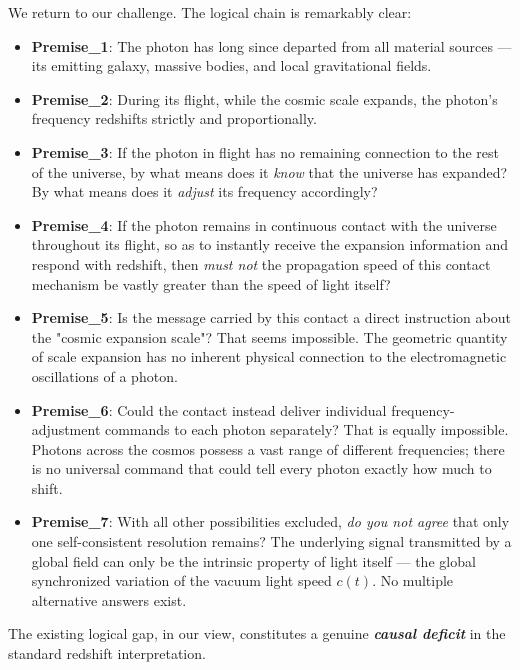 \documentclass[12pt,leqno]{article}
\begin{document}
{	\medskip
	We return to our challenge. The logical chain is remarkably clear:
	\begin{itemize}
		\item \textbf{Premise\_1}: The photon has long since departed from all material sources — its emitting galaxy, massive bodies, and local gravitational fields.
		
		\item \textbf{Premise\_2}: During its flight, while the cosmic scale expands, the photon's frequency redshifts strictly and proportionally.
		
		\item \textbf{Premise\_3}: If the photon in flight has no remaining connection to the rest of the universe, by what means does it \emph{know} that the universe has expanded? By what means does it \emph{adjust} its frequency accordingly?
		
		\item \textbf{Premise\_4}: If the photon remains in continuous contact with the universe throughout its flight, so as to instantly receive the expansion information and respond with redshift, then \emph{must not} the propagation speed of this contact mechanism be vastly greater than the speed of light itself?
		
		\item \textbf{Premise\_5}: Is the message carried by this contact a direct instruction about the "cosmic expansion scale"? That seems impossible. The geometric quantity of scale expansion has no inherent physical connection to the electromagnetic oscillations of a photon.
		
		\item \textbf{Premise\_6}: Could the contact instead deliver individual frequency-adjustment commands to each photon separately? That is equally impossible. Photons across the cosmos possess a vast range of different frequencies; there is no universal command that could tell every photon exactly how much to shift.
		
		\item \textbf{Premise\_7}: With all other possibilities excluded, \emph{do you not agree} that only one self-consistent resolution remains? The underlying signal transmitted by a global field can only be the intrinsic property of light itself — the global synchronized variation of the vacuum light speed $c(t)$. No multiple alternative answers exist.
	\end{itemize}
	
	\smallskip
	The existing logical gap, in our view, constitutes a genuine \textbf{\textit{causal deficit}} in the standard redshift interpretation.
	
}
\end{document}
